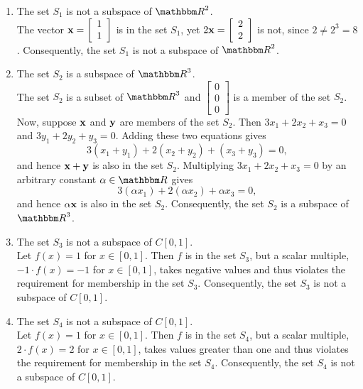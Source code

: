 \begin{solution}
\begin{enumerate}
\item  The set $S_1$ is not a subspace of $\R^2$.\\
The vector $\displaystyle{{\bf x}= \left[\begin{array}{c}1\\ 1\end{array}\right]}$  is in the set $S_1$, yet $\displaystyle{2{\bf x}= \left[\begin{array}{c}2\\ 2\end{array}\right]}$ is not, since $2 \ne 2^3 = 8$. Consequently, the set $S_1$ is not a subspace of $\R^2$.
\\
\item  The set $S_2$ is a subspace of $\R^3$.\\
The set $S_2$ is a subset of $\R^3$ and $\left[\begin{array}{c} 0 \\ 0 \\ 0\end{array}\right]$ is a member of the set $S_2$. Now, suppose ${\bf x}$ and ${\bf y}$ are members of the set $S_2$. Then $3x_1 + 2x_2 + x_3 = 0$ and  $3y_1 + 2y_2 + y_3 = 0$. Adding these two equations gives
\[
 3(x_1+y_1) + 2(x_2+y_2) + (x_3+y_3) = 0,
\]
and hence ${\bf x} + {\bf y}$ is also in the set $S_2$. Multiplying $3x_1 + 2x_2 + x_3 = 0$ by an arbitrary constant $\alpha\in\R$ gives
\[
3(\alpha x_1) + 2(\alpha x_2) + \alpha x_3 = 0,
\]
and hence $\alpha {\bf x}$ is also in the set $S_2$. Consequently, the set $S_2$ is a subspace of $\R^3$.
\\
\item  The set $S_3$ is not a subspace of $C[0,1]$.\\
Let $f(x) = 1$ for $x\in[0,1]$. Then $f$ is in the set $S_3$, but a scalar multiple, $-1\cdot f(x) = -1$ for $x\in[0,1]$, takes negative values and thus violates the requirement for membership in the set $S_3$. Consequently, the set $S_3$ is not a subspace of $C[0,1]$.
\\
\item The set $S_4$ is not a subspace of $C[0,1]$.\\
Let $f(x) = 1$ for $x\in[0,1]$. Then $f$ is in the set $S_4$, but a scalar multiple, $2\cdot f(x) = 2$ for $x\in[0,1]$, takes values greater than one and thus violates the requirement for membership in the set $S_4$. Consequently, the set $S_4$ is not a subspace of $C[0,1]$.
\\

\end{enumerate}
\end{solution}
